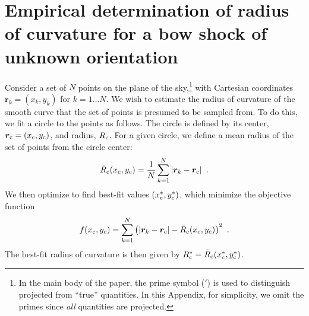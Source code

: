 \section{Empirical determination of radius of curvature for a bow shock of unknown orientation}
\label{app:rcurv-empirical}

Consider a set of \(N\) points on the plane of the sky,\footnote{%
  In the main body of the paper, the prime symbol (\('\)) is used to
  distinguish projected from ``true'' quantities.  In this Appendix,
  for simplicity, we omit the primes since \emph{all} quantities are
  projected.} %
with Cartesian coordinates \(\bm{r}_k = (x_k, y_k)\) for
\(k = 1 \dots N\).  We wish to estimate the radius of curvature of the
smooth curve that the set of points is presumed to be sampled from.
To do this, we fit a circle to the points as follows.  The circle is
defined by its center, \(\bm{r}_{\mathrm{c}} = (x_{\mathrm{c}}, y_{\mathrm{c}})\), and radius,
\(R_{\mathrm{c}}\).  For a given circle, we define a mean radius of the set of
points from the circle center:
\begin{equation}
  \label{eq:rcurv-mean-radius}
  \bar{R}_{\mathrm{c}}(x_{\mathrm{c}}, y_{\mathrm{c}}) = \frac{1}{N}  \sum_{k = 1}^{N} \left\lvert\bm{r}_k - \bm{r}_{\mathrm{c}}\right\rvert  \ .
\end{equation}
We then optimize
to find best-fit values \((x_{\mathrm{c}}^*, y_{\mathrm{c}}^*)\), which minimize the
objective function
\begin{equation}
  \label{eq:rcurv-objective-function}
  f(x_{\mathrm{c}}, y_{\mathrm{c}}) = \sum_{k = 1}^{N} \left(
    \lvert\bm{r}_k - \bm{r}_{\mathrm{c}}\rvert  - \bar{R}_{\mathrm{c}} (x_{\mathrm{c}}, y_{\mathrm{c}}) \right)^2 \ .
\end{equation}
The best-fit radius of curvature is then given by
\(R_{\mathrm{c}}^* = \bar{R}_{\mathrm{c}}(x_{\mathrm{c}}^*, y_{\mathrm{c}}^*)\).


